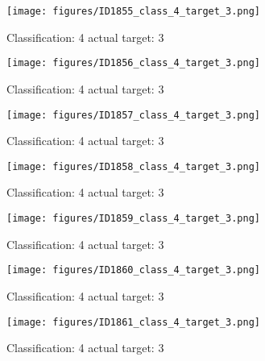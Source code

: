 \begin{figure}[h!]
\begin{center}
\texttt{[image: figures/ID1855\_class\_4\_target\_3.png]}
\end{center}
\caption{ Classification: 4 actual target: 3}
\label{fig:ID1855_class_4_target_3}
\end{figure}
\begin{figure}[h!]
\begin{center}
\texttt{[image: figures/ID1856\_class\_4\_target\_3.png]}
\end{center}
\caption{ Classification: 4 actual target: 3}
\label{fig:ID1856_class_4_target_3}
\end{figure}
\begin{figure}[h!]
\begin{center}
\texttt{[image: figures/ID1857\_class\_4\_target\_3.png]}
\end{center}
\caption{ Classification: 4 actual target: 3}
\label{fig:ID1857_class_4_target_3}
\end{figure}
\begin{figure}[h!]
\begin{center}
\texttt{[image: figures/ID1858\_class\_4\_target\_3.png]}
\end{center}
\caption{ Classification: 4 actual target: 3}
\label{fig:ID1858_class_4_target_3}
\end{figure}
\begin{figure}[h!]
\begin{center}
\texttt{[image: figures/ID1859\_class\_4\_target\_3.png]}
\end{center}
\caption{ Classification: 4 actual target: 3}
\label{fig:ID1859_class_4_target_3}
\end{figure}
\begin{figure}[h!]
\begin{center}
\texttt{[image: figures/ID1860\_class\_4\_target\_3.png]}
\end{center}
\caption{ Classification: 4 actual target: 3}
\label{fig:ID1860_class_4_target_3}
\end{figure}
\begin{figure}[h!]
\begin{center}
\texttt{[image: figures/ID1861\_class\_4\_target\_3.png]}
\end{center}
\caption{ Classification: 4 actual target: 3}
\label{fig:ID1861_class_4_target_3}
\end{figure}
